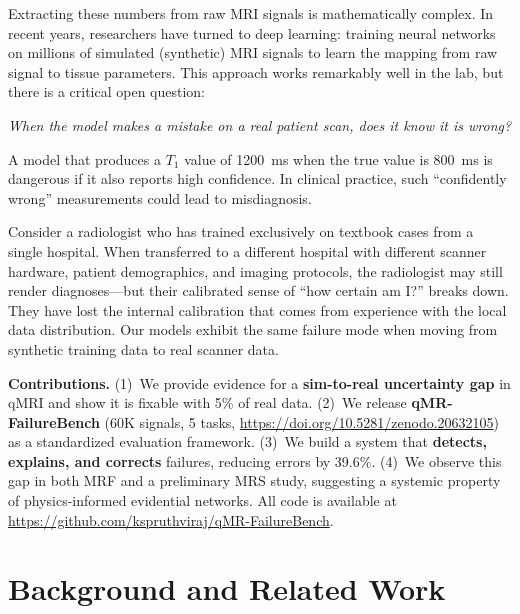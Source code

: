 \documentclass[11pt,a4paper]{article}
\begin{document}
Extracting these numbers from raw MRI signals is mathematically complex. In recent years, researchers have turned to deep learning: training neural networks on millions of simulated (synthetic) MRI signals to learn the mapping from raw signal to tissue parameters. This approach works remarkably well in the lab, but there is a critical open question:

\begin{center}
\textit{When the model makes a mistake on a real patient scan, does it know it is wrong?}
\end{center}

A model that produces a $T_1$ value of 1200~ms when the true value is 800~ms is dangerous if it also reports high confidence. In clinical practice, such ``confidently wrong'' measurements could lead to misdiagnosis.

\begin{intuition}
Consider a radiologist who has trained exclusively on textbook cases from a single hospital. When transferred to a different hospital with different scanner hardware, patient demographics, and imaging protocols, the radiologist may still render diagnoses---but their calibrated sense of ``how certain am I?'' breaks down. They have lost the internal calibration that comes from experience with the local data distribution. Our models exhibit the same failure mode when moving from synthetic training data to real scanner data.
\end{intuition}

\textbf{Contributions.}
(1)~We provide evidence for a \textbf{sim-to-real uncertainty gap} in qMRI and show it is fixable with 5\% of real data.
(2)~We release \textbf{qMR-FailureBench} (60K signals, 5 tasks, \url{https://doi.org/10.5281/zenodo.20632105}) as a standardized evaluation framework.
(3)~We build a system that \textbf{detects, explains, and corrects} failures, reducing errors by 39.6\%.
(4)~We observe this gap in both MRF and a preliminary MRS study, suggesting a systemic property of physics-informed evidential networks.
All code is available at \url{https://github.com/kspruthviraj/qMR-FailureBench}.

\section{Background and Related Work}
\label{sec:related}
\end{document}
